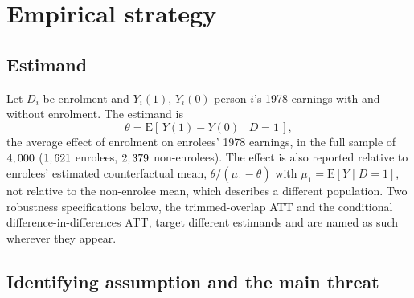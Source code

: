 \documentclass[11pt]{article}
\begin{document}
\begin{table}[tbp]
\centering
\caption{Covariate balance and overlap, computed outcome-blind before the design gate. Means
are raw arm means. The standardized difference is the difference in means divided by
$\sqrt{(s_1^2 + s_0^2)/2}$, with unweighted group SDs, for every term of the propensity
basis $B(X)$. In the ATT-weighted column, controls are weighted by $w = m/(1 - m)$. The
design's balance rule B1 requires every weighted $|$difference$|$ to be below 0.10, and it
holds. Imbens--Wooldridge normalized differences, which use $\sqrt{s_1^2 + s_0^2}$, equal
the unweighted values divided by $\sqrt 2$. Squared terms have no mean column.
$^{a}$~Midwest is the reference category, not a term of $B(X)$; its difference is shown for
information. $^{b}$~$w$ is formed from each repetition's clipped propensity and averaged
over the five repetitions. The overlap panel uses the cross-fitted propensity $\bar m(X)$,
as in Figure~\ref{fig:propensity}. $n = \PrimaryN$.}
\label{tab:balance}
\small

\end{table}

\section{Empirical strategy}
\label{sec:strategy}

\subsection{Estimand}

Let $D_i$ be enrolment and $Y_i(1)$, $Y_i(0)$ person $i$'s 1978 earnings with and without
enrolment. The estimand is
\[
\theta = \mathrm{E}\left[\,Y(1) - Y(0) \mid D = 1\,\right],
\]
the average effect of enrolment on enrolees' 1978 earnings, in the full sample of
$4,000$ ($1,621$ enrolees, $2,379$ non-enrolees). The effect is
also reported relative to enrolees' estimated counterfactual mean,
$\theta / (\mu_1 - \theta)$ with $\mu_1 = \mathrm{E}[Y \mid D = 1]$, not relative to the
non-enrolee mean, which describes a different population. Two robustness specifications
below, the trimmed-overlap ATT and the conditional difference-in-differences ATT, target
different estimands and are named as such wherever they appear.

\subsection{Identifying assumption and the main threat}
\end{document}
